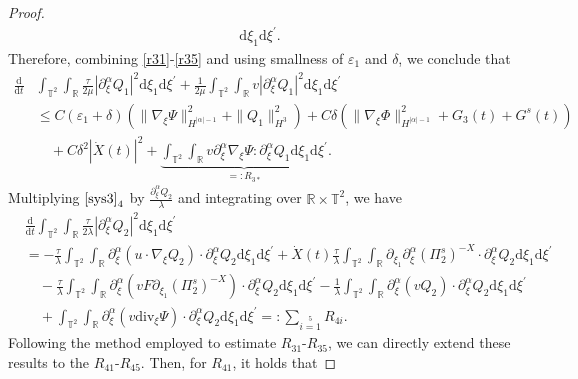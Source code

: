 \documentclass[10pt,reqno]{amsart}
\numberwithin{equation}{section}
\newcommand{\dif}{\mathrm{d}}
\newcommand{\ddiv}{\mathrm{div}}
\begin{document}
\begin{proof}
\begin{equation}
\begin{aligned}
\dif \xi_1\dif \xi^{\prime}.
\end{aligned}
\end{equation}
Therefore, combining \eqref{r31}-\eqref{r35} and using smallness of $\varepsilon_1$ and $\delta$, we conclude that
\begin{equation}\label{hg1.3}
\begin{aligned}
\frac{\dif}{\dif t}&\int_{\mathbb{T}^2}\int_{\mathbb{R}}
\frac{\tau}{2\mu}|\partial_\xi^\alpha Q_1|^2
\dif \xi_1\dif \xi^{\prime}
+\frac{1}{2\mu}\int_{\mathbb{T}^2}\int_{\mathbb{R}}
 v|\partial_\xi^\alpha Q_1|^2\dif \xi_1\dif \xi^{\prime}\\
&\le C(\varepsilon_1+\delta)\left(\|\nabla_\xi\Psi\|_{H^{|\alpha|-1}}^2+
   \| Q_1\|_{H^3}^2\right)
+C\delta\left(\|\nabla_\xi\Phi\|_{H^{|\alpha|-1}}^2+G_3(t)+G^s(t)\right)\\
&\quad+C\delta^2|\dot X(t)|^2+\underbrace{\int_{\mathbb{T}^2}\int_{\mathbb{R}}
v\partial_\xi^\alpha\nabla_\xi\Psi:\partial_\xi^\alpha Q_1
\dif \xi_1\dif \xi^{\prime}}\limits_{=:R_{3\ast}}.
\end{aligned}
\end{equation}
Multiplying $\eqref{sys3}_4$ by $\frac{\partial_\xi^\alpha Q_2}{\lambda}$ and integrating over $\mathbb{R}\times\mathbb{T}^2$, we have
\begin{align*}
&\frac{\dif}{\dif t}\int_{\mathbb{T}^2}\int_{\mathbb{R}}
\frac{\tau}{2\lambda}|\partial_\xi^\alpha Q_2|^2\dif \xi_1\dif \xi^{\prime}\\
&=-\frac{\tau}{\lambda}\int_{\mathbb{T}^2}\int_{\mathbb{R}}\partial_\xi^\alpha \left( u\cdot\nabla_\xi Q_2\right)\cdot\partial_\xi^\alpha Q_2\dif \xi_1\dif \xi^{\prime}
+\dot{X}(t)\frac{\tau}{\lambda}\int_{\mathbb{T}^2}\int_{\mathbb{R}}\partial_{\xi_1}\partial_\xi^\alpha (\Pi_2^s)^{-X}\cdot\partial_\xi^\alpha Q_2\dif \xi_1\dif \xi^{\prime}\\
&\quad-\frac{\tau}{\lambda}\int_{\mathbb{T}^2}\int_{\mathbb{R}}\partial_\xi^\alpha \left(v F\partial_{\xi_1}(\Pi_2^s)^{-X}\right)\cdot\partial_\xi^\alpha Q_2\dif \xi_1\dif \xi^{\prime}
-\frac{1}{\lambda}\int_{\mathbb{T}^2}\int_{\mathbb{R}}\partial_\xi^\alpha \left(vQ_2\right)\cdot\partial_\xi^\alpha Q_2\dif \xi_1\dif \xi^{\prime}\\
&\quad+\int_{\mathbb{T}^2}\int_{\mathbb{R}}
\partial_\xi^\alpha \left(v\ddiv_\xi \Psi\right)\cdot\partial_\xi^\alpha Q_2\dif \xi_1\dif \xi^{\prime}=:\sum\limits_{i=1}\limits^5R_{4i}.
\end{align*}
Following the method employed to estimate $R_{31}$-$R_{35}$, we can directly extend these results to the $R_{41}$-$R_{45}$. Then, for $R_{41}$, it holds that

\end{proof}
\end{document}
